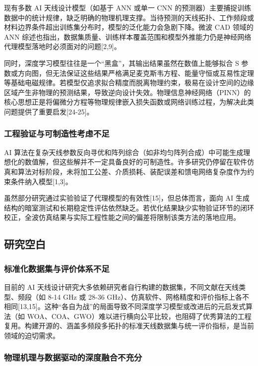 \documentclass[UTF8,a4paper,12pt]{ctexart}
\begin{document}
现有多数 AI 天线设计模型（如基于 ANN 或单一 CNN 的预测器）主要捕捉训练数据中的统计规律，缺乏明确的物理机理支撑。当待预测的天线拓扑、工作频段或材料边界条件超出训练集分布时，模型的泛化能力会急剧下降。微波 CAD 领域的 ANN 综述也指出，数据集质量、训练样本覆盖范围和模型外推能力仍是神经网络代理模型落地时必须面对的问题[2,9]。

同时，深度学习模型往往是一个“黑盒”，其输出结果虽然在数值上能够拟合 S 参数或方向图，但无法保证这些结果严格满足麦克斯韦方程、能量守恒或互易性定理等基础电磁规律。若模型仅追求拟合精度而脱离物理约束，极易在设计空间的边缘区域产生非物理的预测结果，导致逆向设计失效。物理信息神经网络（PINN）的核心思想正是将偏微分方程等物理规律嵌入损失函数或网络训练过程，为解决此类问题提供了重要启发[24-25]。

\subsubsection{工程验证与可制造性考虑不足}

AI 算法在复杂天线参数反向寻优和阵列综合（如非均匀阵列合成）中可能生成理想化的数值解，但这些解并不一定具备良好的可制造性。许多研究仍停留在软件仿真和算法对标阶段，未将加工公差、介质损耗、装配误差和馈电网络复杂度作为约束条件纳入模型[1,3]。

虽然部分研究通过实验验证了代理模型的有效性[15]，但总体而言，面向 AI 生成结构的暗室测试和长期稳定性评估依然缺乏。若优化结果缺少实物验证环节的闭环校正，全波仿真结果与实际工程性能之间的偏差将限制该类方法的落地应用。

\subsection{研究空白}

\subsubsection{标准化数据集与评价体系不足}

目前的 AI 天线设计研究大多依赖研究者自行构建的数据集，不同文献在天线类型、频段（如 8-14 GHz 或 28-36 GHz）、仿真软件、网格精度和评价指标上各不相同[13,15]。这种“各自为战”的局面导致不同深度学习模型或改进后的元启发式算法（如 WOA、COA、GWO）难以进行横向公平比较，也阻碍了优秀算法的工程复用。构建开源的、涵盖多频段多拓扑的标准天线数据集与统一评价指标，是当前领域的迫切需求。

\subsubsection{物理机理与数据驱动的深度融合不充分}
\end{document}
